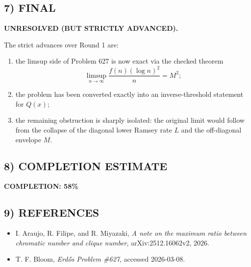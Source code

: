 \subsection*{7) FINAL}

\textbf{UNRESOLVED (BUT STRICTLY ADVANCED).}

The strict advances over Round 1 are:

\begin{enumerate}
\item the limsup side of Problem 627 is now exact via the checked theorem
\[
\limsup_{n\to\infty}\frac{f(n)(\log n)^2}{n}=M^2;
\]
\item the problem has been converted exactly into an inverse-threshold statement for
\(Q(x)\);
\item the remaining obstruction is sharply isolated: the original limit would follow from the collapse of the diagonal lower Ramsey rate \(L\) and the off-diagonal envelope \(M\).
\end{enumerate}

\subsection*{8) COMPLETION ESTIMATE}

\textbf{COMPLETION: 58\%}

\subsection*{9) REFERENCES}

\begin{itemize}
\item[\textbf{[AFM25]}] I. Araujo, R. Filipe, and R. Miyazaki, \emph{A note on the maximum ratio between chromatic number and clique number}, arXiv:2512.16062v2, 2026.
\item[\textbf{[Bloom627]}] T. F. Bloom, \emph{Erd\H{o}s Problem \#627}, accessed 2026-03-08.
\end{itemize}

